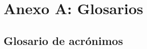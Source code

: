 \documentclass[12pt]{report} %
\begin{document}


\clearpage
{}
\printbibliography











\chapter* {Anexo A: Glosarios}



\section* {Glosario de acrónimos}

\end{document}
